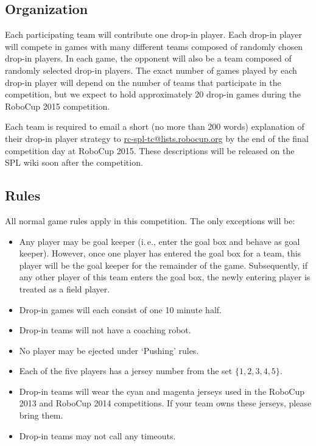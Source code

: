 \documentclass[12pt]{article}
\newcommand{\ie}{\mbox{i.\,e.}\xspace}
\begin{document}
\subsection{Organization}

Each participating team will contribute one drop-in player.  Each drop-in player will compete in games with many different teams composed of randomly chosen drop-in players.  In each game, the opponent will also be a team composed of randomly selected drop-in players.  The exact number of games played by each drop-in player will depend on the number of teams that participate in the competition, but we expect to hold approximately 20 drop-in games during the RoboCup 2015 competition.

Each team is required to email a short (no more than 200 words) explanation of their drop-in player strategy to \url{rc-spl-tc@lists.robocup.org} by the end of the final competition day at RoboCup 2015.  These descriptions will be released on the SPL wiki soon after the competition.

\subsection{Rules}
\label{sec:drop-in:rules}
All normal game rules apply in this competition.  The only exceptions will be:
\begin{itemize}
\item Any player may be goal keeper (\ie, enter the goal box and behave as goal keeper).  However, once one player has entered the goal box for a team, this player will be the goal keeper for the remainder of the game.  Subsequently, if any other player of this team enters the goal box, the newly entering player is treated as a field player.
\item Drop-in games will each consist of one 10 minute half.
\item Drop-in teams will not have a coaching robot.
\item No player may be ejected under `Pushing' rules.
\item Each of the five players has a jersey number from the set $\{1, 2, 3, 4, 5\}$.
\item Drop-in teams will wear the cyan and magenta jerseys used in the RoboCup 2013 and RoboCup 2014 competitions.  If your team owns these jerseys, please bring them.
\item Drop-in teams may not call any timeouts.
\end{itemize}
\end{document}
